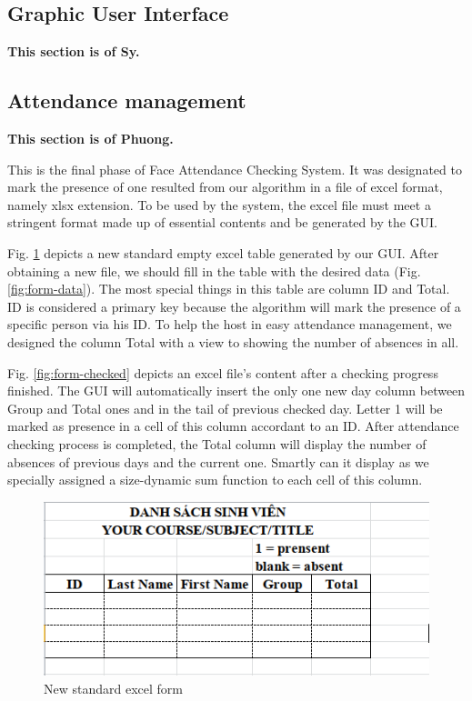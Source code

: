 \documentclass[journal, twocolumn]{IEEEtran}
\begin{document}
\subsection{Graphic User Interface}
\label{gui}
\textbf{This section is of Sy.}


\subsection{Attendance management}
\label{attendance-management}
\textbf{This section is of Phuong.}

This is the final phase of Face Attendance Checking System.
It was designated to mark the presence of one resulted from
our algorithm in a file of excel format, namely xlsx extension.
To be used by the system, the excel file must meet
a stringent format made up of essential contents and be
generated by the GUI. 

Fig. \ref{fig:form-new} depicts a new standard empty
excel table generated by our GUI. After obtaining a new file, we should fill in the table with the desired data (Fig. \ref{fig:form-data}). The most special things in this table are column ID and Total. 
ID is considered a primary key because the algorithm will mark the presence of a specific person via his ID. 
To help the host in easy attendance management, we designed the column Total with a view to showing the number of absences in all.

Fig. \ref{fig:form-checked} depicts an excel file's content after a checking progress finished. 
The GUI will automatically insert the only one new day column between Group and Total ones and in the tail of previous checked day. 
Letter 1 will be marked as presence in a cell of this column accordant to an ID. 
After attendance checking process is completed, the Total column will display the number of absences of previous days and the current one. Smartly can it display as we specially assigned a size-dynamic sum function to each cell of this column.


\begin{figure}
    \centering
    \includegraphics[width=0.8\linewidth]{img/form-new.png}
	\caption{New standard excel form}\label{fig:form-new}
\end{figure}
\end{document}
